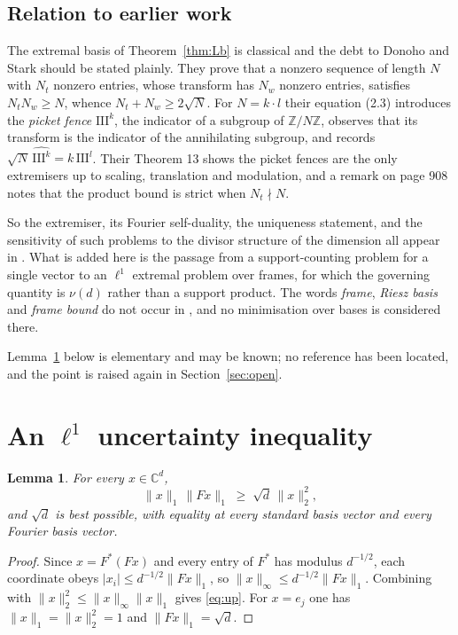 \documentclass[11pt,reqno]{amsart}
\theoremstyle{plain}
\newtheorem{lemma}[theorem]{Lemma}
\theoremstyle{definition}
\theoremstyle{remark}
\newcommand{\C}{\mathbb{C}}
\newcommand{\Z}{\mathbb{Z}}
\begin{document}
\subsection{Relation to earlier work}\label{sec:classical}

The extremal basis of Theorem~\ref{thm:Lb} is classical and the debt to
Donoho and Stark \cite{DonohoStark} should be stated plainly.  They
prove that a nonzero sequence of length $N$ with $N_t$ nonzero entries,
whose transform has $N_w$ nonzero entries, satisfies $N_tN_w\ge N$,
whence $N_t+N_w\ge2\sqrt N$.  For $N=k\cdot l$ their equation (2.3)
introduces the \emph{picket fence} $\mathrm{III}^k$, the indicator of a
subgroup of $\Z/N\Z$, observes that its transform is the indicator of
the annihilating subgroup, and records
$\sqrt N\,\widehat{\mathrm{III}^k}=k\,\mathrm{III}^l$.  Their Theorem 13
shows the picket fences are the only extremisers up to scaling,
translation and modulation, and a remark on page 908 notes that the
product bound is strict when $N_t\nmid N$.

So the extremiser, its Fourier self-duality, the uniqueness statement,
and the sensitivity of such problems to the divisor structure of the
dimension all appear in \cite{DonohoStark}.  What is added here is the
passage from a support-counting problem for a single vector to an
$\ell^1$ extremal problem over frames, for which the governing quantity
is $\nu(d)$ rather than a support product.  The words \emph{frame},
\emph{Riesz basis} and \emph{frame bound} do not occur in
\cite{DonohoStark}, and no minimisation over bases is considered there.

Lemma~\ref{lem:up} below is elementary and may be known; no reference
has been located, and the point is raised again in
Section~\ref{sec:open}.

\section{An \texorpdfstring{$\ell^1$}{l1} uncertainty inequality}

\begin{lemma}\label{lem:up}
For every $x\in\C^d$,
\begin{equation}\label{eq:up}
  \|x\|_1\,\|Fx\|_1\;\ge\;\sqrt d\,\|x\|_2^2,
\end{equation}
and $\sqrt d$ is best possible, with equality at every standard basis
vector and every Fourier basis vector.
\end{lemma}

\begin{proof}
Since $x=F^{*}(Fx)$ and every entry of $F^{*}$ has modulus $d^{-1/2}$,
each coordinate obeys $|x_i|\le d^{-1/2}\|Fx\|_1$, so
$\|x\|_\infty\le d^{-1/2}\|Fx\|_1$.  Combining with
$\|x\|_2^2\le\|x\|_\infty\|x\|_1$ gives \eqref{eq:up}.  For $x=e_j$ one
has $\|x\|_1=\|x\|_2^2=1$ and $\|Fx\|_1=\sqrt d$.
\end{proof}
\end{document}
